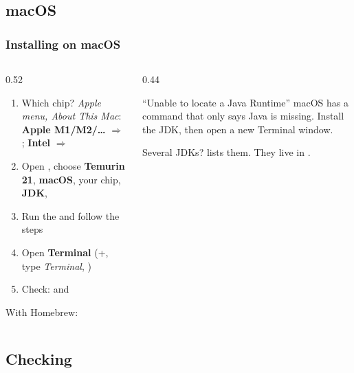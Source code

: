 \documentclass[aspectratio=169,10pt,compress]{beamer}
\begin{document}
\subsection[macOS]{macOS}




\begin{frame}[t,fragile] \frametitle{Installing on macOS}
  \begin{columns}[T]
    \begin{column}{0.52\textwidth}
      \begin{enumerate}\small
        \item Which chip? \emph{Apple menu, About This Mac}: \textbf{Apple M1/M2/\dots} $\Rightarrow$ ; \textbf{Intel} $\Rightarrow$ 
        \item Open , choose \textbf{Temurin 21}, \textbf{macOS}, your chip, \textbf{JDK}, 
        \item Run the  and follow the steps
        \item Open \textbf{Terminal} (+, type \emph{Terminal}, )
        \item Check:  and 
      \end{enumerate}
      \footnotesize With Homebrew: 
    \end{column}
    \begin{column}{0.44\textwidth}
      \begin{alertblock}{``Unable to locate a Java Runtime''}
        \footnotesize macOS has a  command that only says Java is missing. Install the JDK, then open a new Terminal window.
      \end{alertblock}
      \begin{block}{Several JDKs?}
        \footnotesize {} lists them. They live in .
      \end{block}
    \end{column}
  \end{columns}
\end{frame}

\subsection[Check]{Checking}
\end{document}
